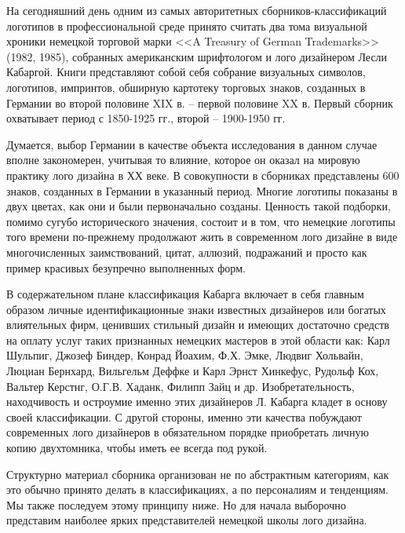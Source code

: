 На сегодняшний день одним из самых авторитетных сборников\hyp{}классификаций логотипов в профессиональной
среде принято считать два тома визуальной хроники немецкой торговой марки <<A Treasury of German
Trademarks>> (1982, 1985), собранных американским шрифтологом и лого дизайнером Лесли
Кабаргой. Книги представляют собой себя собрание визуальных символов, логотипов, импринтов, обширную
картотеку торговых знаков, созданных в Германии во второй половине XIX в. -- первой половине XX
в. Первый сборник охватывает период с 1850-1925 гг., второй -- 1900-1950 гг.\autocite{cabarga1982treasury}

Думается, выбор Германии в качестве объекта исследования в данном случае вполне закономерен,
учитывая то влияние, которое он оказал на мировую практику лого дизайна в ХХ веке. В совокупности в
сборниках представлены 600 знаков, созданных в Германии в указанный период. Многие логотипы показаны
в двух цветах, как они и были первоначально созданы. Ценность такой подборки, помимо сугубо
исторического значения, состоит и в том, что немецкие логотипы того времени по-прежнему продолжают
жить в современном лого дизайне в виде многочисленных заимствований, цитат, аллюзий, подражаний и
просто как пример красивых безупречно выполненных форм.

В содержательном плане классификация Кабарга включает в себя главным образом личные
идентификационные знаки известных дизайнеров или богатых влиятельных фирм, ценивших стильный дизайн
и имеющих достаточно средств на оплату услуг таких признанных немецких мастеров в этой области как: Карл Шульпиг, Джозеф Биндер, Конрад Йоахим, Ф.Х. Эмке, Людвиг Хольвайн, Люциан Бернхард, Вильгельм Деффке и Карл Эрнст Хинкефус, Рудольф Кох, Вальтер Керстнг, О.Г.В. Хаданк, Филипп Зайц и др. Изобретательность, находчивость и остроумие именно этих дизайнеров Л. Кабарга кладет в
основу своей классификации. С другой стороны, именно эти качества побуждают современных лого
дизайнеров в обязательном порядке приобретать личную копию двухтомника, чтобы иметь ее всегда под
рукой.

Структурно материал сборника организован не по абстрактным категориям, как это обычно принято делать
в классификациях, а по персоналиям и тенденциям. Мы также последуем этому принципу ниже. Но для
начала выборочно представим наиболее ярких представителей немецкой школы лого дизайна.

